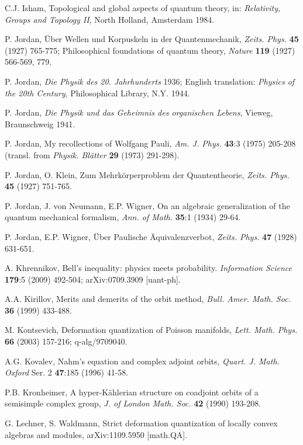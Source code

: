\begin{thebibliography}{000}
 C.J. Isham, Topological and global aspects of quantum theory, in: {\it
Relativity, Groups and Topology II}, North Holland, Amsterdam 1984.

 P. Jordan, \"Uber Wellen und Korpuskeln in der
Quantenmechanik, {\it Zeits. Phys.} {\bf 45} (1927) 765-775; Philosophical
foundations of quantum theory, {\it Nature} {\bf 119} (1927) 566-569, 779.

 P. Jordan, {\it Die Physik des 20. Jahrhunderts} 1936; English
translation: {\it Physics of the 20th Century}, Philosophical Library, N.Y. 1944.

 P. Jordan, {\it Die Physik und das Geheimnis des organischen Lebens}, 
Vieweg, Braunschweig 1941.

 P. Jordan, My recollections of Wolfgang Pauli, {\it Am. J. Phys.}
{\bf 43}:3 (1975) 205-208 (transl. from {\it Physik. Bl\"atter} {\bf 29} (1973) 291-298). 

 P. Jordan, O. Klein, Zum  Mehrk\"orperproblem der
Quantentheorie, {\it Zeits. Phys.} {\bf 45} (1927) 751-765.

 P. Jordan, J. von Neumann, E.P. Wigner, On an algebraic generalization of the 
quantum mechanical formalism, {\it Ann. of Math.} {\bf 35}:1 (1934) 29-64.

 P. Jordan, E.P. Wigner, \"Uber Paulische
\"Aquivalenzverbot, {\it Zeits. Phys.} {\bf 47} (1928) 631-651.

 A. Khrennikov, Bell's inequality: physics meets probability. 
{\it Information Science} {\bf 179}:5 (2009) 492-504; arXiv:0709.3909 [uant-ph].

 A.A. Kirillov, Merits and demerits of the orbit method, {\it
 Bull. Amer. Math. Soc.} {\bf 36} (1999) 433-488.

 M. Kontsevich, Deformation quantization of Poisson manifolds,
{\it Lett. Math. Phys.} {\bf 66} (2003) 157-216; q-alg/9709040. 

 A.G. Kovalev, Nahm's equation and complex adjoint orbits,
{\it Quart. J. Math. Oxford} Ser. 2 {\bf 47}:185 (1996) 41-58.

 P.B. Kronheimer, A hyper-K\"ahlerian structure on coadjoint orbits 
of a semisimple complex group, {\it J. of London Math. Soc.} {\bf 42} (1990) 193-208.
 
 G. Lechner, S. Waldmann, Strict deformation quantization of locally convex algebras and modules, arXiv:1109.5950 [math.QA].   


\end{thebibliography}
